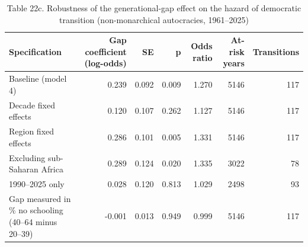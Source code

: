 \begin{table}
\caption{Table 22c. Robustness of the generational-gap effect on the hazard of democratic transition (non-monarchical autocracies, 1961–2025)}
\label{tab:T22c_gap_robustness}
\begin{tabular}{lrrrrrr}
\toprule
Specification & Gap coefficient (log-odds) & SE & p & Odds ratio & At-risk years & Transitions \\
\midrule
Baseline (model 4) & 0.239 & 0.092 & 0.009 & 1.270 & 5146 & 117 \\
Decade fixed effects & 0.120 & 0.107 & 0.262 & 1.127 & 5146 & 117 \\
Region fixed effects & 0.286 & 0.101 & 0.005 & 1.331 & 5146 & 117 \\
Excluding sub-Saharan Africa & 0.289 & 0.124 & 0.020 & 1.335 & 3022 & 78 \\
1990–2025 only & 0.028 & 0.120 & 0.813 & 1.029 & 2498 & 93 \\
Gap measured in \% no schooling (40–64 minus 20–39) & -0.001 & 0.013 & 0.949 & 0.999 & 5146 & 117 \\
\bottomrule
\end{tabular}
\end{table}
